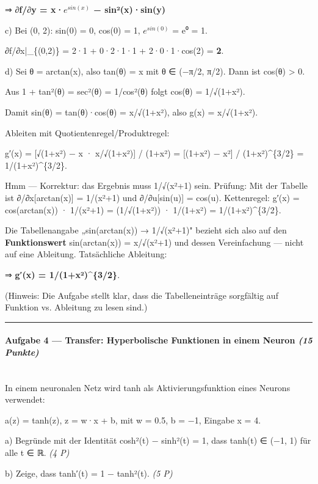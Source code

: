 \documentclass[11pt, a4paper]{article}
\begin{document}
⇒ \textbf{∂f/∂y = x·$e^{sin(x)}$ − sin²(x)·sin(y)}


c) Bei (0, 2): sin(0) = 0, cos(0) = 1, $e^{sin(0)}$ = e⁰ = 1.

∂f/∂x|\_\{(0,2)\} = 2·1 + 0·2·1·1 + 2·0·1·cos(2) = \textbf{2}.


d) Sei θ = arctan(x), also tan(θ) = x mit θ ∈ (−π/2, π/2). Dann ist cos(θ) > 0.

Aus 1 + tan²(θ) = sec²(θ) = 1/cos²(θ) folgt cos(θ) = 1/√(1+x²).

Damit sin(θ) = tan(θ)·cos(θ) = x/√(1+x²), also g(x) = x/√(1+x²).


Ableiten mit Quotientenregel/Produktregel:

g′(x) = [√(1+x²) − x · x/√(1+x²)] / (1+x²) = [(1+x²) − x²] / (1+x²)\textasciicircum{}\{3/2\} = 1/(1+x²)\textasciicircum{}\{3/2\}.


Hmm — Korrektur: das Ergebnis muss 1/√(x²+1) sein. Prüfung: Mit der Tabelle ist ∂/∂x[arctan(x)] = 1/(x²+1) und ∂/∂u[sin(u)] = cos(u). Kettenregel: g′(x) = cos(arctan(x)) · 1/(x²+1) = (1/√(1+x²)) · 1/(1+x²) = 1/(1+x²)\textasciicircum{}\{3/2\}.


Die Tabellenangabe „sin(arctan(x)) → 1/√(x²+1)" bezieht sich also auf den \textbf{Funktionswert} sin(arctan(x)) = x/√(x²+1) und dessen Vereinfachung — nicht auf eine Ableitung. Tatsächliche Ableitung:


⇒ \textbf{g′(x) = 1/(1+x²)\textasciicircum{}\{3/2\}}.


(Hinweis: Die Aufgabe stellt klar, dass die Tabelleneinträge sorgfältig auf Funktion vs. Ableitung zu lesen sind.)



\noindent\textcolor{rulegray}{\rule{\linewidth}{0.4pt}}


\paragraph{Aufgabe 4 — Transfer: Hyperbolische Funktionen in einem Neuron \textit{(15 Punkte)}}\mbox{}\\[2pt]

In einem neuronalen Netz wird tanh als Aktivierungsfunktion eines Neurons verwendet:

a(z) = tanh(z), z = w·x + b, mit w = 0.5, b = −1, Eingabe x = 4.


a) Begründe mit der Identität cosh²(t) − sinh²(t) = 1, dass tanh(t) ∈ (−1, 1) für alle t ∈ ℝ. \textit{(4 P)}


b) Zeige, dass tanh′(t) = 1 − tanh²(t). \textit{(5 P)}
\end{document}

